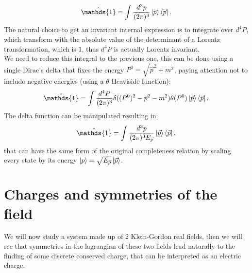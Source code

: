 \begin{equation*}
    \hat{\mathds{1}}=\int\frac{d^3p}{(2\pi)^3}\ket{\vec p}\bra{\vec p}.
\end{equation*}
The natural choice to get an invariant internal expression is to integrate over $d^4P$, which transform with the absolute value of the determinant of a Lorentz transformation, which is $1$, thus $d^4P$ is actually Lorentz invariant.\\We need to reduce this integral to the previous one, this can be done using a single Dirac's delta that fixes the energy $P^0=\sqrt{\vec p^2+m^2}$, paying attention not to include negative energies (using a $\theta$ Heaviside function):
\begin{equation*}
    \hat{\mathds{1}}=\int\frac{d^4P}{(2\pi)^3}\delta((P^0)^2-\vec p^2-m^2)\theta(P^0)\ket{\vec p}\bra{\vec p}.
\end{equation*}
The delta function can be manipulated resulting in:
\begin{equation*}
    \hat{\mathds{1}}=\int\frac{d^3p}{(2\pi)^3E_{\vec p}}\ket{\vec p}\bra{\vec p},
\end{equation*}
that can have the same form of the original completeness relation by scaling every state by its energy $\ket{p}=\sqrt{E_{\vec p}}\ket{\vec p}$.
\section{Charges and symmetries of the field}
We will now study a system made up of $2$ Klein-Gordon real fields, then we will see that symmetries in the lagrangian of these two fields lead naturally to the finding of some discrete conserved charge, that can be interpreted as an electric charge.\\

